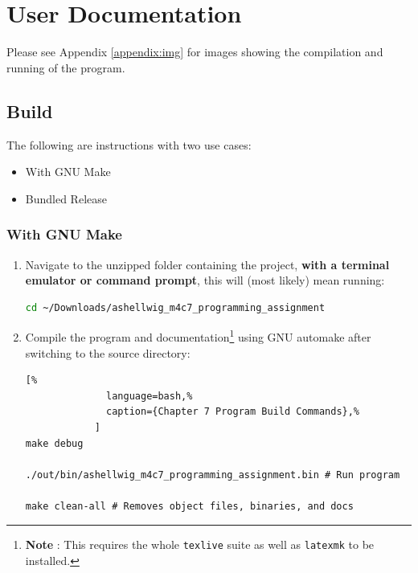\documentclass[a4paper, 11pt]{article}
\theoremstyle{definition}
\theoremstyle{plain}
\begin{document}
  \newpage
  \section{User Documentation}
    Please see Appendix \ref{appendix:img} for images showing the compilation
      and running of the program.

    \subsection{Build}
      The following are instructions with two use cases:
      \begin{itemize}
        \item With GNU Make
        \item Bundled Release
      \end{itemize}
      \subsubsection{With GNU Make}
        \begin{enumerate}
          \item Navigate to the unzipped folder containing the project,
            \textbf{with a terminal emulator or command prompt}, this will
            (most likely) mean running:
            \begin{lstlisting}[language=bash]
cd ~/Downloads/ashellwig_m4c7_programming_assignment
            \end{lstlisting}
          \item Compile the program and documentation\footnote{\textbf{Note%
            }: This requires the whole \texttt{texlive} suite as well as
            \texttt{latexmk} to be installed.} using GNU automake after
            switching to the source directory:
            \begin{lstlisting}[%
              language=bash,%
              caption={Chapter 7 Program Build Commands},%
            ]
make debug

./out/bin/ashellwig_m4c7_programming_assignment.bin # Run program

make clean-all # Removes object files, binaries, and docs
            \end{lstlisting}
          \end{enumerate}
\end{document}
